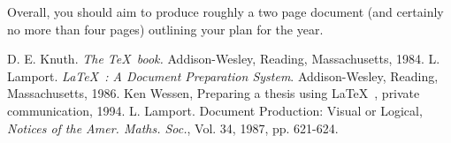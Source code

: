 \documentclass[12pt, a4paper]{article}
\begin{document}
Overall, you should aim to produce roughly a two page document
(and certainly no more than four pages)
outlining your plan for the year.

\begin{thebibliography}{9}
 D. E. Knuth. {\em The \TeX~book.}\/ Addison-Wesley,
Reading, Massachusetts, 1984.
 L. Lamport. {\em \LaTeX~: A Document Preparation
System}.\/ Addison-Wesley, Reading, Massachusetts, 1986.
 Ken Wessen, Preparing a thesis using \LaTeX~, private
communication, 1994.
 L. Lamport. Document Production: Visual
or Logical, {\em Notices of the Amer. Maths. Soc.},\/ Vol. 34,
1987, pp. 621-624.
\end{thebibliography}
\end{document}
